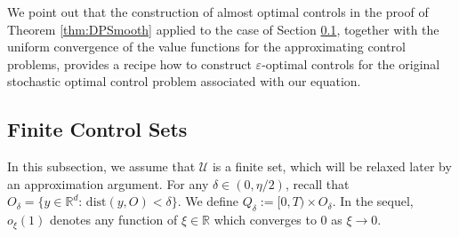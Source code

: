 \documentclass[amscd,amssymb,11pt]{article}
\numberwithin{theorem}{section}
\numberwithin{equation}{section}
\begin{document}
We point out that the construction of almost optimal controls in the proof of Theorem \ref{thm:DPSmooth} applied to the
case of Section \ref{Subsec:DPVisSolFinCtrl}, together with the uniform convergence of the value functions for the approximating control problems, provides a recipe how to construct $\varepsilon$-optimal controls for the original stochastic optimal control problem associated with our equation.


\subsection{Finite Control Sets}\label{Subsec:DPVisSolFinCtrl}


In this subsection, we assume that $\mathcal{U}$ is a finite set, which will be relaxed later by an approximation argument. For any $\delta\in(0,\eta/2)$, recall that $O_{\delta}=\{y\in\mathbb{R}^{d}:\,\text{dist}(y,O)<\delta\}$. We define $Q_{\delta}:=[0,T)\times O_{\delta}$.
In the sequel, $o_{\xi}(1)$ denotes any function of $\xi\in\mathbb{R}$ which converges to 0 as $\xi\rightarrow 0$.
\end{document}
